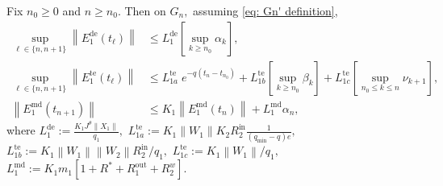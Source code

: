 \documentclass[usenames,dvipsnames,final,12pt]{colt2018} %
\newcommand{\Xt}{X_1}
\newcommand{\Wt}{W_1}
\newcommand{\st}{\alpha}
\newcommand{\mt}{m_1}
\newcommand{\lt}{q_1}
\newcommand{\Rto}{R_1^\textrm{out}}
\newcommand{\Et}{E_1}
\newcommand{\Kt}{K_1}
\newcommand{\EtD}{\Et^{\dt}}
\newcommand{\EtM}{\Et^{\md}}
\newcommand{\EtT}{\Et^{\te}}
\newcommand{\LtD}{L_1^{\dt}}
\newcommand{\LtM}{L_1^{\md}}
\newcommand{\LtT}[1]{L_{1 #1}^{\te}}
\newcommand{\Ww}{W_2}
\newcommand{\Rzi}{R_2^{\textrm{in}}}
\newcommand{\rz}{\nu}
\newcommand{\Kz}{K_2}
\newcommand{\lmin}{q_{\min}}
\newcommand{\lm}{q}
\newcommand{\dt}{\text{de}}
\newcommand{\md}{\text{md}}
\newcommand{\te}{\text{te}}
\newcommand{\tI}[1]{t_{#1}}
\newcommand{\norm}[1]{\left\lVert#1\right\rVert}
\newcommand{\Rw}{R_2^w}
\newcommand{\Rs}{R^*}
\newcommand{\Jt}{J^\theta}
\newcommand{\gal}[1]{#1}
\begin{document}
\begin{lemma}
\label{lem:EtDBd}
Fix $n_0 \geq 0$ and $n \geq n_0.$ Then on $ G_n,$ \gal{assuming \eqref{eq: Gn' definition}},
\begin{align*}
\sup_{\ell \in \{n, n + 1\}} \norm{\EtD(\tI{\ell})} & \leq \LtD \left[\sup_{k \geq n_0} \st_k\right], \\
\sup_{\ell \in \{n, n + 1\}} \norm{\EtT(\tI{\ell})} &\leq \LtT{a} \; e^{-\lm(\tI{n} - \tI{n_0})} + \LtT{b}\left[\sup_{k \geq n_0}  \beta_k\right]
+  \LtT{c} \left[\sup_{n_0 \leq k \leq n} \rz_{k + 1}\right], \\
\norm{\EtM(\tI{n + 1})} & \leq \Kt \norm{\EtM(\tI{n})} +  \LtM \st_n,
\end{align*}
%
where  $\LtD := \frac{\Kt \Jt \norm{\Xt}}{\lt},$
$\LtT{a}  :=  \Kt \norm{\Wt} \Kz \Rzi  \frac{1}{(\lmin-\lm)e},$ $\LtT{b}  :=  \Kt \norm{\Wt}\norm{\Ww} \Rzi/ \lt,$ $\LtT{c}  :=  \Kt \norm{\Wt} /\lt,$ $\LtM := \Kt \mt[1 + \Rs + \Rto + \Rw].$

\end{lemma}
\end{document}
